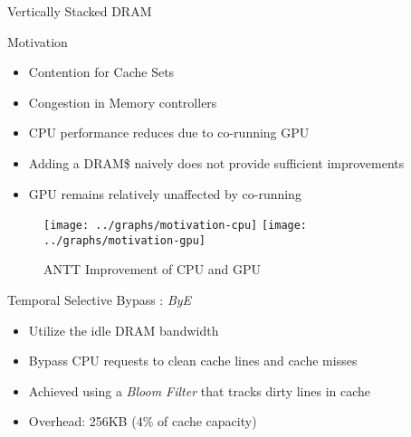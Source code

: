 \documentclass[final,t]{beamer}
\begin{document}
\begin{frame}[t,fragile]{}
\begin{columns}[t]
\begin{column}{.47\linewidth}
\begin{exampleblock}{Vertically Stacked DRAM}
\begin{itemize}
        \end{itemize}
    \end{exampleblock}
    \begin{exampleblock}{Motivation}
        \begin{itemize}
        	\item Contention for Cache Sets
       		\item Congestion in Memory controllers
       		\item CPU performance reduces due to co-running GPU
       		\item Adding a DRAM\$ naively does not provide sufficient improvements
       		\item GPU remains relatively unaffected by co-running
        \end{itemize}
        
    \end{exampleblock}
    
    
    \begin{figure}
       \texttt{[image: ../graphs/motivation-cpu]}
       \texttt{[image: ../graphs/motivation-gpu]}
       \caption{ANTT Improvement of CPU and GPU}
       \label{fig:motivation}
    \end{figure}
    \begin{exampleblock}{Temporal Selective Bypass : \textit{ByE}}
    \begin{itemize}
	    \item Utilize the idle DRAM bandwidth
	    \item Bypass CPU requests to clean cache lines and cache misses
	    \item Achieved using a \textit{Bloom Filter} that tracks dirty lines in cache
	    \item Overhead: 256KB (4\% of cache capacity)
    \end{itemize}
    \end{exampleblock}

\end{column}



\end{columns}
\end{frame}
\end{document}
